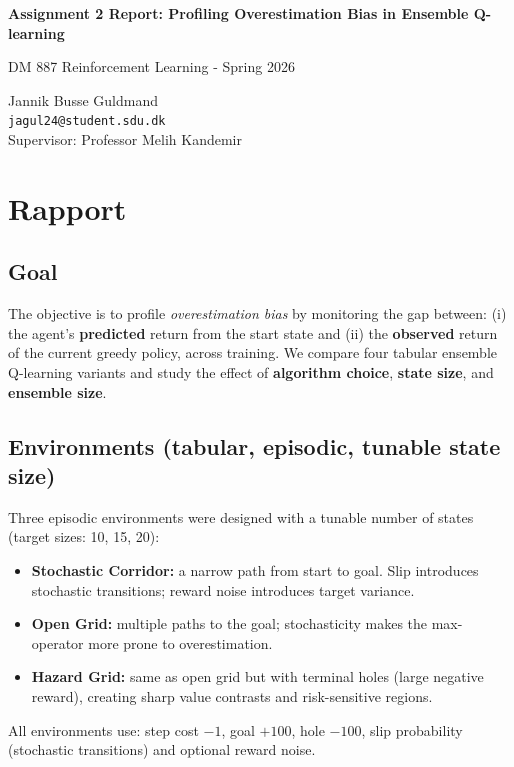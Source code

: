 \documentclass[11pt,a4paper]{article}
\begin{document}
\begin{center}
{\LARGE\bfseries Assignment 2 Report: Profiling Overestimation Bias in Ensemble Q-learning\par}
\vspace{0.5em}
{\normalsize DM 887 Reinforcement Learning - Spring 2026\par}
\vspace{0.8em}
\end{center}

\begin{center}
Jannik Busse Guldmand \\
\texttt{jagul24@student.sdu.dk} \\
Supervisor: Professor Melih Kandemir
\end{center}

\vspace{0.6em}

\section*{Rapport}

\subsection*{Goal}
The objective is to profile \emph{overestimation bias} by monitoring the gap between:
(i) the agent's \textbf{predicted} return from the start state and
(ii) the \textbf{observed} return of the current greedy policy, across training.
We compare four tabular ensemble Q-learning variants and study the effect of \textbf{algorithm choice}, \textbf{state size}, and \textbf{ensemble size}.

\subsection*{Environments (tabular, episodic, tunable state size)}
Three episodic environments were designed with a tunable number of states (target sizes: 10, 15, 20):
\begin{itemize}
  \item \textbf{Stochastic Corridor:} a narrow path from start to goal. Slip introduces stochastic transitions; reward noise introduces target variance.
  \item \textbf{Open Grid:} multiple paths to the goal; stochasticity makes the max-operator more prone to overestimation.
  \item \textbf{Hazard Grid:} same as open grid but with terminal holes (large negative reward), creating sharp value contrasts and risk-sensitive regions.
\end{itemize}
All environments use: step cost \(-1\), goal \(+100\), hole \(-100\), slip probability (stochastic transitions) and optional reward noise.
\end{document}
